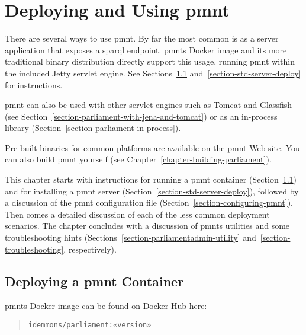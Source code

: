 
\chapter{Deploying and Using \acl{pmnt}}
\label{chapter-deploying-and-using}

There are several ways to use \ac{pmnt}.  By far the most common is as a server application that exposes a \ac{sparql} endpoint.  \acp{pmnt} Docker image and its more traditional binary distribution directly support this usage, running \ac{pmnt} within the included Jetty servlet engine.  See Sections~\ref{section-std-container-deploy} and~\ref{section-std-server-deploy} for instructions.

\ac{pmnt} can also be used with other servlet engines such as Tomcat and Glassfish (see Section~\ref{section-parliament-with-jena-and-tomcat}) or as an in-process library (Section~\ref{section-parliament-in-process}).

Pre-built binaries for common platforms are available on the \ac{pmnt} Web site.  You can also build \ac{pmnt} yourself (see Chapter~\ref{chapter-building-parliament}).

This chapter starts with instructions for running a \ac{pmnt} container (Section~\ref{section-std-container-deploy}) and for installing a \ac{pmnt} server (Section~\ref{section-std-server-deploy}), followed by a discussion of the \ac{pmnt} configuration file (Section~\ref{section-configuring-pmnt}).  Then comes a detailed discussion of each of the less common deployment scenarios.  The chapter concludes with a discussion of \acp{pmnt} utilities and some troubleshooting hints (Sections~\ref{section-parliamentadmin-utility} and~\ref{section-troubleshooting}, respectively).

\section{Deploying a \ac{pmnt} Container}
\label{section-std-container-deploy}

\acp{pmnt} Docker image can be found on Docker Hub here:
\begin{quote}
\texttt{idemmons/parliament:«version»}
\end{quote}

